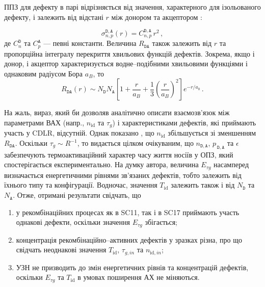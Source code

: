 ППЗ для дефекту в парі відрізняється від значення, характерного для ізольованого дефекту, і залежить від відстані $r$ між донором та акцептором \cite{CDLR:JAP}:

\begin{equation}
\label{eqSigma}
\sigma_{n,p}^{\mathtt{D,A}}(r)=C_{n,p}^{\mathtt{D,A}}\,r^2\,,
\end{equation}
де $C_{n}^{\mathtt{D}}$ та $C_{p}^{\mathtt{A}}$ --- певні константи.
Величина $R_{\mathtt{DA}}$ також залежить від $r$ та пропорційна інтегралу перекриття хвильових функцій дефектів.
Зокрема, якщо і донор, і акцептор характеризується водне--подібними хвильовими функціями і однаковим радіусом Бора $a_B$, то \cite{CDLR:JAP}
\begin{equation}
\label{eqRda}
R_{\mathtt{DA}} (r) \sim N_{\mathtt{D}}N_{\mathtt{A}}\left[1+\frac{r}{a_B}+\frac{1}{3}\left(\frac{r}{a_B}\right)^2\right]
   e^{-r/a_0}\,.
\end{equation}

На жаль, вираз, який би дозволяв аналітично описати взаємозв'язок між параметрами ВАХ (напр., $n_{\mathrm{id}}$ та $\tau_g$)
і характеристиками дефектів, які приймають участь у CDLR, відсутній.
Однак показано \cite{CDLR:JAP1995,CDLR:SSP}, що $n_{\mathrm{id}}$ збільшується зі зменшенням $R_{\mathtt{DA}}$.
Оскільки $\tau_g\sim R^{-1}$,
то видається цілком очікуваним, що $n_{\mathtt{D,A}}$, $p_{\,\mathtt{D,A}}$ та $\epsilon$ забезпечують термоактиваційний характер часу життя носіїв у ОПЗ, який спостерігається експериментально.
На  думку автора, величина $E_{\tau g}$ насамперед визначається енергетичними рівнями зв'язаних дефектів, тобто
залежить від їхнього типу та конфігурації.
Водночас, значення $T_\mathrm{id}$ залежить також і від $N_\mathtt{D}$ та $N_\mathtt{A}$.
Отже, отримані результати свідчать, що
\begin{enumerate}[label=\asbuk*),leftmargin=0em,itemindent=1.5em]
\item у рекомбінаційних процесах як в SC11, так і в SC17 приймають участь однакові дефекти, оскільки значення $E_{\tau g}$ збігається;
\item концентрація рекомбінаційно--активних дефектів у зразках різна, про що свідчать неоднакові значення $T_\mathrm{id}$, $\tau_{g,in}$ та $n_{\mathrm{id},in}$;
\item УЗН не призводить до змін енергетичних рівнів та концентрацій дефектів, оскільки  $E_{\tau g}$ та $T_\mathrm{id}$ в умовах поширення АХ не міняються.
\end{enumerate}

